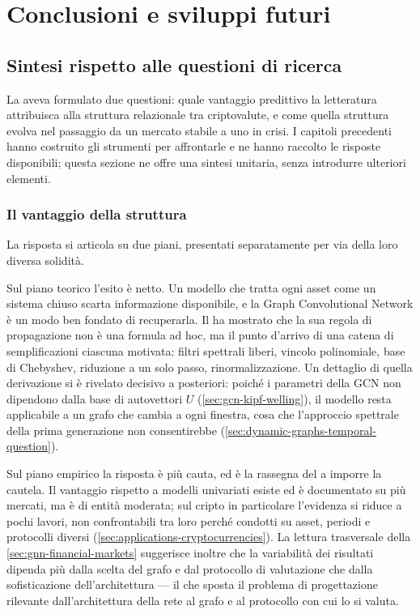 \chapter{Conclusioni e sviluppi futuri}
\label{ch:conclusions}

\section{Sintesi rispetto alle questioni di ricerca}
\label{sec:summary-research-questions}

La  aveva formulato due questioni: quale vantaggio predittivo la letteratura attribuisca alla struttura relazionale tra criptovalute, e come quella struttura evolva nel passaggio da un mercato stabile a uno in crisi. I capitoli precedenti hanno costruito gli strumenti per affrontarle e ne hanno raccolto le risposte disponibili; questa sezione ne offre una sintesi unitaria, senza introdurre ulteriori elementi.

\subsection*{Il vantaggio della struttura}

La risposta si articola su due piani, presentati separatamente per via della loro diversa solidità.

Sul piano teorico l'esito è netto. Un modello che tratta ogni asset come un sistema chiuso scarta informazione disponibile, e la Graph Convolutional Network è un modo ben fondato di recuperarla. Il  ha mostrato che la sua regola di propagazione non è una formula ad hoc, ma il punto d'arrivo di una catena di semplificazioni ciascuna motivata: filtri spettrali liberi, vincolo polinomiale, base di Chebyshev, riduzione a un solo passo, rinormalizzazione. Un dettaglio di quella derivazione si è rivelato decisivo a posteriori: poiché i parametri della GCN non dipendono dalla base di autovettori $U$ (\cref{sec:gcn-kipf-welling}), il modello resta applicabile a un grafo che cambia a ogni finestra, cosa che l'approccio spettrale della prima generazione non consentirebbe (\cref{sec:dynamic-graphs-temporal-question}).

Sul piano empirico la risposta è più cauta, ed è la rassegna del  a imporre la cautela. Il vantaggio rispetto a modelli univariati esiste ed è documentato su più mercati, ma è di entità moderata; sul cripto in particolare l'evidenza si riduce a pochi lavori, non confrontabili tra loro perché condotti su asset, periodi e protocolli diversi (\cref{sec:applications-cryptocurrencies}). La lettura trasversale della \cref{sec:gnn-financial-markets} suggerisce inoltre che la variabilità dei risultati dipenda più dalla scelta del grafo e dal protocollo di valutazione che dalla sofisticazione dell'architettura — il che sposta il problema di progettazione rilevante dall'architettura della rete al grafo e al protocollo con cui lo si valuta.

